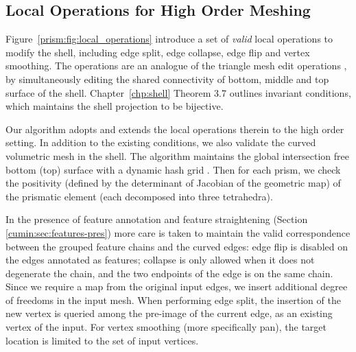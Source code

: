 \subsection{Local Operations for High Order Meshing}
\label{app:local-ops}
Figure~\ref{prism:fig:local_operations} introduce a set of \emph{valid} local operations to modify the shell, including edge split, edge collapse, edge flip and vertex smoothing. 
The operations are an analogue of the triangle mesh edit operations \cite{dunyach2013adaptive}, 
by simultaneously editing the shared connectivity of bottom, middle and top surface of the shell.
Chapter~\ref{chp:shell} Theorem 3.7 outlines invariant conditions, which maintains the shell projection to be bijective. 

Our algorithm adopts and extends the local operations therein to the high order setting. In addition to the existing conditions, we also validate the curved volumetric mesh in the shell.
The algorithm maintains the global intersection free bottom (top) surface with a dynamic hash grid \cite{teschner2003optimized}. Then for each prism, we check the positivity (defined by the determinant of Jacobian of the geometric map) of the prismatic element (each decomposed into three tetrahedra).

In the presence of feature annotation and feature straightening (Section \ref{cumin:sec:features-pres}) more care is taken to maintain the valid correspondence between the grouped feature chains and the curved edges: 
edge flip is disabled on the edges annotated as features; collapse is only allowed when it does not degenerate the chain, and the two endpoints of the edge is on the same chain. 
Since we require a map from the original input edges, we insert additional degree of freedoms in the input mesh. When performing edge split, the insertion of the new vertex is queried among the pre-image of the current edge, as an existing vertex of the input. For vertex smoothing (more specifically pan), the target location is limited to the set of input vertices.
